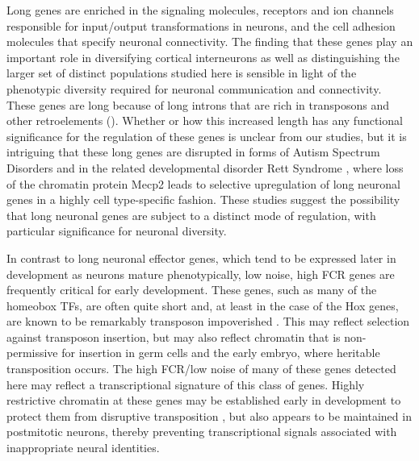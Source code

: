 Long genes are enriched in the signaling molecules, receptors and ion channels responsible for input/output transformations in neurons, and the cell adhesion molecules that specify neuronal connectivity. The finding that these genes play an important role in diversifying cortical interneurons \cite{Paul_2017} as well as distinguishing the larger set of distinct populations studied here is sensible in light of the phenotypic diversity required for neuronal communication and connectivity. These genes are long because of long introns that are rich in transposons and other retroelements (). Whether or how this increased length has any functional significance for the regulation of these genes is unclear from our studies, but it is intriguing that these long genes are disrupted in forms of Autism Spectrum Disorders \citep{Zylka_2015,Wei_2016} and in the related developmental disorder Rett Syndrome \citep{Sugino_2014,Gabel_2015}, where loss of the chromatin protein Mecp2 leads to selective upregulation of long neuronal genes in a highly cell type-specific fashion. These studies suggest the possibility that long neuronal genes are subject to a distinct mode of regulation, with particular significance for neuronal diversity.   

In contrast to long neuronal effector genes, which tend to be expressed later in development as neurons mature phenotypically, low noise, high FCR genes are frequently critical for early development. These genes, such as many of the homeobox TFs, are often quite short and, at least in the case of the Hox genes, are known to be remarkably transposon impoverished \citep{Chinwalla_2002,Simons_2005}. This may reflect selection against transposon insertion, but may also reflect chromatin that is non-permissive for insertion in germ cells and the early embryo, where heritable transposition occurs. The high FCR/low noise of many of these genes detected here may reflect a transcriptional signature of this class of genes. Highly restrictive chromatin at these genes may be established early in development to protect them from disruptive transposition \citep{Montavon_2014}, but also appears to be maintained in postmitotic neurons, thereby preventing transcriptional signals associated with inappropriate neural identities. 


